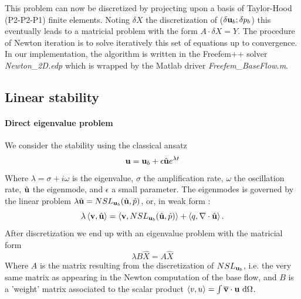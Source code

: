 \documentclass[twocolumn,10pt]{asme2ej}
\newcommand{\be}[1]{ \begin{equation} \label{#1}}
\newcommand{\ee}{\end{equation}}
\begin{document}
This problem can now be discretized by projecting upon a basis of Taylor-Hood (P2-P2-P1) finite elements. Noting $\delta X$ the discretization of ($\delta {\bf u}_b;\delta p_b$) this eventually leads to a matricial problem with the form $A \cdot \delta X = Y$. The procedure of Newton iteration is to solve iteratively this set of equations up to convergence.
In our implementation, the algorithm is written in the Freefem++ solver {\em Newton\_2D.edp} 
which is wrapped by the Matlab driver {\em Freefem\_BaseFlow.m}.

\subsection{Linear stability}
\vspace{.2cm}

\paragraph{Direct eigenvalue problem}
We consider the stability using the classical ansatz 
\be{startmodepropre}
{\bf u} = {\bf u}_b + \epsilon \hat{\bf u} e^{\lambda t} 
\ee
Where $\lambda = \sigma + i \omega$ is the eigenvalue, $\sigma$ the amplification rate,
$\omega$ the oscillation rate, $\hat{{\bf u}}$ the eigenmode, and $\epsilon$ a small parameter.
The eigenmodes is governed by the linear problem 
$\lambda \hat{{\bf u}} = NSL_{{\bf u}_b}( \hat{\bf u},\hat{p})$, or, in weak form : 
\be{eigenvalueproblem}
\lambda \left< {\bf v} , \hat{{\bf u}} \right> = \left< {\bf v}, NSL_{{\bf u}_b} ( \hat{\bf u},\hat{p})\right> + \left< q, \nabla \cdot \hat{\bf u} \right>.
\ee
After discretization we end up with an eigenvalue problem with the matricial form
\be{Eigen_matricial}
\lambda B \hat{X} = A \hat{X}
\ee
Where $A$ is the matrix resulting from the discretization of $NSL_{{\bf u}_b}$, i.e. the very same matrix as appearing in the Newton computation of the base flow, and  $B$ is a 'weight' matrix associated to the scalar product $\left<v,u\right> = \int \overline{\bf v} \cdot {\bf u} \mbox{ d} \Omega$.
\end{document}
